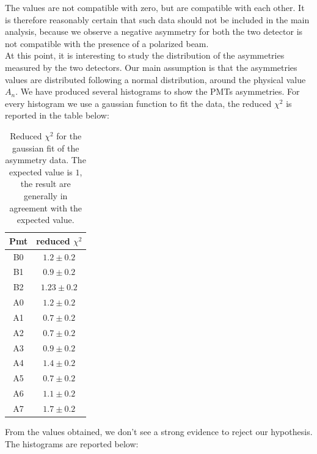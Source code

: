 The values are not compatible with zero, but are compatible with each other. It is therefore reasonably certain that such data should not be included in the main analysis, because we observe a negative asymmetry for both the two detector is not compatible with the presence of a polarized beam. \\
At this point, it is interesting to study the distribution of the asymmetries measured by the two detectors. Our main assumption is that the asymmetries values are distributed following a normal distribution, around the physical value $A_{n}$. We have produced several histograms to show the PMTs asymmetries. For every histogram we use a gaussian function to fit the data, the reduced $\chi^{2}$ is reported in the table below:

\begin{table}[hbtp]
\centering
\begin{tabular}{c|c}
\hline 
Pmt & reduced $\chi^{2}$ \\ 
\hline
B0 & $1.2 \pm 0.2$ \\ 
B1 & $0.9 \pm 0.2$ \\ 
B2 & $1.23 \pm 0.2$ \\
A0 & $1.2 \pm 0.2$ \\ 
A1 & $0.7 \pm 0.2$ \\ 
A2 & $0.7 \pm 0.2$ \\ 
A3 & $0.9 \pm 0.2$ \\ 
A4 & $1.4 \pm 0.2$ \\ 
A5 & $0.7 \pm 0.2$ \\ 
A6 & $1.1 \pm 0.2$ \\ 
A7 & $1.7 \pm 0.2$ \\ 
\hline 
\end{tabular}
\caption{Reduced $\chi^{2}$ for the gaussian fit of the asymmetry data. The expected value is $1$, the result are generally in agreement with the expected value.  } 
\end{table}

From the values obtained, we don't see a strong evidence to reject our hypothesis. The histograms are reported below:


